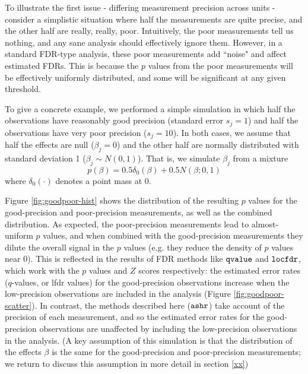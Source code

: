 \documentclass[11pt]{article}
\def\qvalue{{\tt qvalue}\xspace}
\def\locfdr{{\tt locfdr}\xspace}
\def\ashr{{\tt ashr}\xspace}
\begin{document}
 To illustrate the first issue - differing measurement precision across units - consider a simplistic
 situation where half the measurements are quite precise, and the other half are really, really, poor. 
 Intuitively, the poor measurements tell us nothing, and any sane analysis should effectively ignore them. However, in a standard FDR-type analysis, these poor measurements add ``noise" and affect estimated FDRs. This is because the $p$ values from the poor measurements will be effectively uniformly distributed, and some will be significant at any given threshold. 
 
To give a concrete example, we performed a simple simulation in which half the observations have
reasonably good precision (standard error $s_j = 1$) and half the observations have very poor precision ($s_j=10$). In both cases,
we assume that half the effects are null ($\beta_j=0$)
and the other half are normally distributed with standard deviation 1 ($\beta_j \sim N(0,1)$). 
That is, we simulate $\beta_j$ from a mixture 
\begin{equation}
p(\beta) = 0.5 \delta_0(\beta) + 0.5 N(\beta; 0,1)
\end{equation}
where $\delta_0(\cdot)$ denotes a point mass at 0.

Figure \ref{fig:goodpoor-hist} shows the distribution of the resulting $p$ values for the good-precision and poor-precision measurements, as
well as the combined distribution. As expected, the poor-precision measurements lead to almost-uniform $p$ values, and when combined
with the good-precision measurements they dilute the overall signal in the $p$ values (e.g. they reduce the density of $p$ values near 0).
This is reflected in the results of FDR methods like $\qvalue$ and $\locfdr$, which work with the $p$ values and $Z$ scores respectively:
the estimated error rates ($q$-values, or lfdr values) for the good-precision observations increase when the low-precision observations are included in the analysis
(Figure \ref{fig:goodpoor-scatter}). In contrast, the methods described here ($\ashr$) take account of the precision of each measurement, and so
the estimated error rates for the good-precision observations are unaffected by including the low-precision observations in the analysis.
(A key assumption of this simulation is that the distribution of the effects $\beta$ is the same for the good-precision and poor-precision measurements;
we return to discuss this assumption in more detail in section \ref{xx})
\end{document}
